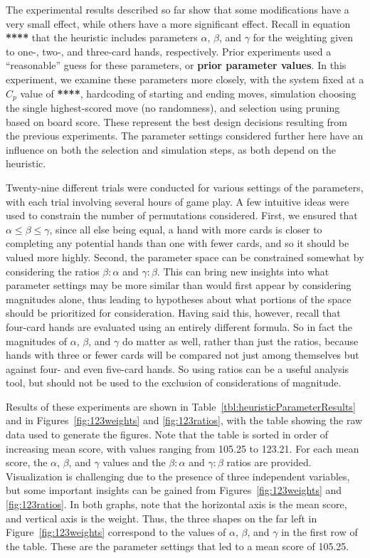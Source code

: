 \documentclass[letterpaper]{article}
\begin{document}
The experimental results described so far show that some modifications have a very small effect, while others have a more significant effect. Recall in equation {\bf *****} that the heuristic includes parameters $\alpha$, $\beta$, and $\gamma$ for the weighting given to one-, two-, and three-card hands, respectively. Prior experiments used a ``reasonable'' guess for these parameters, or {\bf prior parameter values}. In this experiment, we examine these parameters more closely, with the system fixed at a $C_p$ value of {\bf *****}, hardcoding of starting and ending moves, simulation choosing the single highest-scored move (no randomness), and selection using pruning based on board score. These represent the best design decisions resulting from the previous experiments. The parameter settings considered further here have an influence on both the selection and simulation steps, as both depend on the heuristic.

Twenty-nine different trials were conducted for various settings of the parameters, with each trial involving several hours of game play. A few intuitive ideas were used to constrain the number of permutations considered. First, we ensured that $\alpha \leq \beta \leq \gamma$, since all else being equal, a hand with more cards is closer to completing any potential hands than one with fewer cards, and so it should be valued more highly. Second, the parameter space can be constrained somewhat by considering the ratios $\beta : \alpha$ and $\gamma : \beta$. This can bring new insights into what parameter settings may be more similar than would first appear by considering magnitudes alone, thus leading to hypotheses about what portions of the space should be prioritized for consideration. Having said this, however, recall that four-card hands are evaluated using an entirely different formula. So in fact the magnitudes of $\alpha$, $\beta$, and $\gamma$ do matter as well, rather than just the ratios, because hands with three or fewer cards will be compared not just among themselves but against four- and even five-card hands. So using ratios can be a useful analysis tool, but should not be used to the exclusion of considerations of magnitude.

Results of these experiments are shown in Table~\ref{tbl:heuristicParameterResults} and in Figures~\ref{fig:123weights} and \ref{fig:123ratios}, with the table showing the raw data used to generate the figures. Note that the table is sorted in order of increasing mean score, with values ranging from 105.25 to 123.21. For each mean score, the $\alpha$, $\beta$, and $\gamma$ values and the $\beta : \alpha$ and $\gamma : \beta$ ratios are provided. Visualization is challenging due to the presence of three independent variables, but some important insights can be gained from Figures~\ref{fig:123weights} and \ref{fig:123ratios}. In both graphs, note that the horizontal axis is the mean score, and vertical axis is the weight. Thus, the three shapes on the far left in Figure~\ref{fig:123weights} correspond to the values of $\alpha$, $\beta$, and $\gamma$ in the first row of the table. These are the parameter settings that led to a mean score of 105.25.
\end{document}
